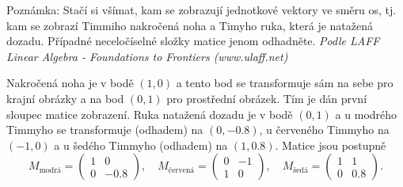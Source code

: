 
Poznámka: Stačí si všímat, kam se zobrazují jednotkové vektory ve směru os, tj. kam se zobrazí Timmiho nakročená noha a Timyho ruka, která je natažená dozadu. Případné neceločíselné složky matice jenom odhadněte. \textit{Podle LAFF Linear Algebra - Foundations to Frontiers (www.ulaff.net)}

\reseni

Nakročená noha je v bodě $(1,0)$ a tento bod se transformuje sám na sebe pro krajní obrázky a na bod $(0,1)$ pro prostřední obrázek. Tím je dán první sloupec matice zobrazení. Ruka natažená dozadu je v bodě $(0,1)$ a u modrého Timmyho se transformuje (odhadem) na $(0,-0.8)$, u červeného Timmyho na $(-1,0)$ a u šedého Timmyho (odhadem) na $(1,0.8)$. Matice jsou postupně
\begin{equation*}
  M_{\text{modrá}}=
  \begin{pmatrix}
    1 & 0
    \\
    0 &-0.8
  \end{pmatrix},
\quad
  M_{\text{červená}}=
  \begin{pmatrix}
    0 & -1
    \\
    1 & 0
  \end{pmatrix},\quad
  M_{\text{šedá}}=
  \begin{pmatrix}
    1 & 1
    \\
    0 & 0.8
  \end{pmatrix}.
\end{equation*}

